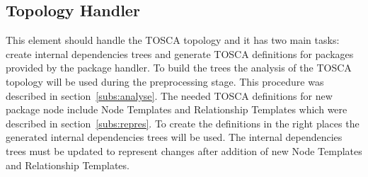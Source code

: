\subsection{Topology Handler} \label{subs:archtop}
This element should handle the TOSCA topology and it has two main tasks: create internal dependencies trees and generate TOSCA definitions for packages provided by the package handler.
To build the trees the analysis of the TOSCA topology will be used during the preprocessing stage.
This procedure was described in section~\ref{subs:analyse}.
The needed TOSCA definitions for new package node include Node Templates and Relationship Templates which were described in section~\ref{subs:repres}.
To create the definitions in the right places the generated internal dependencies trees will be used.
The internal dependencies trees must be updated to represent changes after addition of new Node Templates and Relationship Templates.
